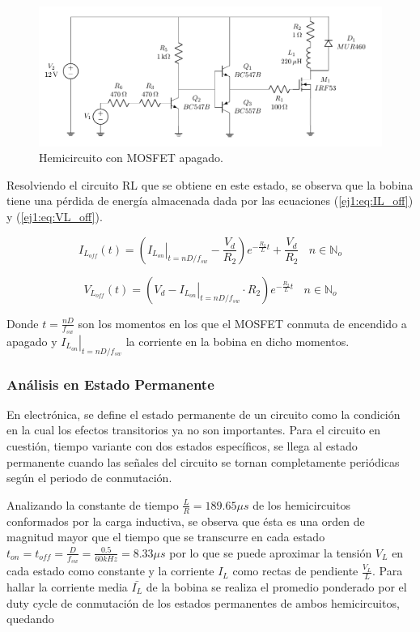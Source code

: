 \begin{figure}[H]
	\centering
	\includegraphics[width=0.7\linewidth, page=2]{ImagenesEjercicio-1/CircuitsEj1}
	\caption{Hemicircuito con MOSFET apagado.}
	\label{ej1:fig:circuito_off}
\end{figure}

Resolviendo el circuito RL que se obtiene en este estado, se observa que la bobina tiene una pérdida de energía almacenada dada por las ecuaciones (\ref{ej1:eq:IL_off}) y (\ref{ej1:eq:VL_off}).

\begin{equation}
	 I_{L_{off}}(t) = \left( \left. I_{L_{on}} \right|_{t= nD/f_{sw}} -\frac{V_d}{R_2}\right) e^{-\frac{R_2}{L}t} + \frac{V_d}{R_2} \ \ \ \ n \in \mathbb{N}_o
\label{ej1:eq:IL_off}
\end{equation}

\begin{equation}
	 V_{L_{off}}(t) = \left( V_d - \left. I_{L_{on}} \right|_{t= nD/f_{sw}} \cdot R_2 \right)e^{-\frac{R_2}{L}t} \ \ \ \ n \in \mathbb{N}_o
\label{ej1:eq:VL_off}
\end{equation}

Donde $t=\frac{nD}{f_{sw}}$ son los momentos en los que el MOSFET conmuta de encendido a apagado y $\left. I_{L_{on}} \right|_{t= nD/f_{sw}}$ la corriente en la bobina en dicho momentos. 

\subsubsection{Análisis en Estado Permanente}

En electrónica, se define el estado permanente de un circuito como la condición en la cual los efectos transitorios ya no son importantes. Para el circuito en cuestión, tiempo variante con dos estados específicos, se llega al estado permanente cuando las señales del circuito se tornan completamente periódicas según el periodo de conmutación. 

Analizando la constante de tiempo $\frac{L}{R} = 189.65\mu s$ de los hemicircuitos conformados por la carga inductiva, se observa que ésta es una orden de magnitud mayor que el tiempo que se transcurre en cada estado $t_{on} = t_{off} = \frac{D}{f_{sw}} = \frac{0.5}{60kHz} = 8.33\mu s$ por lo que se puede aproximar la tensión $V_L$ en cada estado como constante y la corriente $I_L$ como rectas de pendiente $\frac{V_L}{L}$. Para hallar la corriente media $\bar{I_L}$ de la bobina se realiza el promedio ponderado por el duty cycle de conmutación de los estados permanentes de ambos hemicircuitos, quedando

